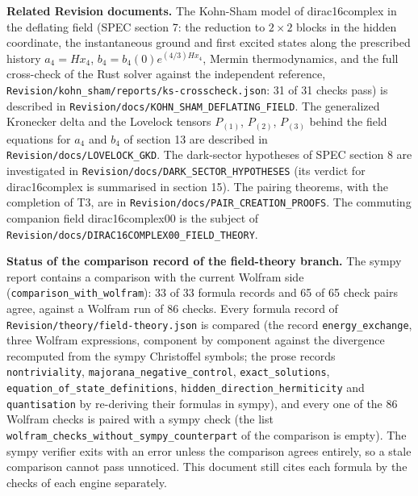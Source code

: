 \documentclass[11pt]{article}
\begin{document}
\textbf{Related Revision documents.} The Kohn-Sham model of dirac16complex in the deflating field (SPEC section 7: the reduction to $2 \times 2$ blocks in the hidden coordinate, the instantaneous ground and first excited states along the prescribed history $a_4 = Hx_4$, $b_4 = b_4(0)e^{(4/3)Hx_4}$, Mermin thermodynamics, and the full cross-check of the Rust solver against the independent reference, \texttt{Revision\allowbreak{}/kohn\_sh\allowbreak{}am/repor\allowbreak{}ts/ks-cr\allowbreak{}osscheck\allowbreak{}.json}: 31 of 31 checks pass) is described in \texttt{Revision\allowbreak{}/docs/KO\allowbreak{}HN\_SHAM\_\allowbreak{}DEFLATIN\allowbreak{}G\_FIELD}. The generalized Kronecker delta and the Lovelock tensors $P_{(1)}$, $P_{(2)}$, $P_{(3)}$ behind the field equations for $a_4$ and $b_4$ of section 13 are described in \texttt{Revision\allowbreak{}/docs/LO\allowbreak{}VELOCK\_G\allowbreak{}KD}. The dark-sector hypotheses of SPEC section 8 are investigated in \texttt{Revision\allowbreak{}/docs/DA\allowbreak{}RK\_SECTO\allowbreak{}R\_HYPOTH\allowbreak{}ESES} (its verdict for dirac16complex is summarised in section 15). The pairing theorems, with the completion of T3, are in \texttt{Revision\allowbreak{}/docs/PA\allowbreak{}IR\_CREAT\allowbreak{}ION\_PROO\allowbreak{}FS}. The commuting companion field dirac16complex00 is the subject of \texttt{Revision\allowbreak{}/docs/DI\allowbreak{}RAC16COM\allowbreak{}PLEX00\_F\allowbreak{}IELD\_THE\allowbreak{}ORY}.

\textbf{Status of the comparison record of the field-theory branch.} The sympy report contains a comparison with the current Wolfram side (\texttt{comparis\allowbreak{}on\_with\_\allowbreak{}wolfram}): 33 of 33 formula records and 65 of 65 check pairs agree, against a Wolfram run of 86 checks. Every formula record of \texttt{Revision\allowbreak{}/theory/\allowbreak{}field-th\allowbreak{}eory.jso\allowbreak{}n} is compared (the record \texttt{energy\_e\allowbreak{}xchange}, three Wolfram expressions, component by component against the divergence recomputed from the sympy Christoffel symbols; the prose records \texttt{nontrivi\allowbreak{}ality}, \texttt{majorana\allowbreak{}\_negativ\allowbreak{}e\_contro\allowbreak{}l}, \texttt{exact\_so\allowbreak{}lutions}, \texttt{equation\allowbreak{}\_of\_stat\allowbreak{}e\_defini\allowbreak{}tions}, \texttt{hidden\_d\allowbreak{}irection\allowbreak{}\_hermiti\allowbreak{}city} and \texttt{quantisa\allowbreak{}tion} by re-deriving their formulas in sympy), and every one of the 86 Wolfram checks is paired with a sympy check (the list \texttt{wolfram\_\allowbreak{}checks\_w\allowbreak{}ithout\_s\allowbreak{}ympy\_cou\allowbreak{}nterpart} of the comparison is empty). The sympy verifier exits with an error unless the comparison agrees entirely, so a stale comparison cannot pass unnoticed. This document still cites each formula by the checks of each engine separately.
\end{document}
